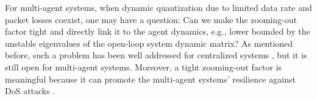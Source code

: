 \documentclass[letterpaper,journal,final,twocolumn]{IEEEtran}
\begin{document}
For multi-agent systems, when dynamic quantization due to limited data rate and packet losses coexist, one may have a question: Can we make the zooming-out factor tight and directly link it to the agent dynamics, e.g., lower bounded by the unstable eigenvalues of the open-loop system dynamic matrix? As mentioned before, such a problem has been well addressed for centralized systems \cite{1310461, you2010minimum}, but it is still open for multi-agent systems. Moreover, a tight zooming-out factor is meaningful because it can promote the multi-agent systems' resilience against DoS attacks \cite{feng2020arxiv,9954904}.   




%
%
%
%
%



\end{document}
